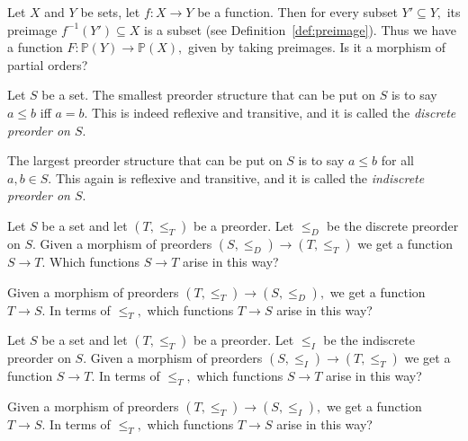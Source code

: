\documentclass[../main/CT4S-EN-RU]{subfiles}
\begin{document}
\begin{applicationRUS}
\end{applicationRUS}

\begin{exerciseENG}
Let $X$ and $Y$ be sets, let $f\colon X{→} Y$ be a function. Then for every subset $Y'\subseteq Y,$ its preimage $f^{-1}(Y')\subseteq X$ is a subset (see Definition~\ref{def:preimage}). Thus we have a function $F\colon{ℙ}(Y){→}{ℙ}(X),$ given by taking preimages. Is it a morphism of partial orders?
\end{exerciseENG}

\begin{exerciseRUS}
\end{exerciseRUS}

\begin{exampleENG}\label{ex:discrete and indiscrete}
Let $S$ be a set. The smallest preorder structure that can be put on $S$ is to say $a\leq b$ iff $a=b.$ This is indeed reflexive and transitive, and it is called the {\em discrete preorder on $S$}.

The largest preorder structure that can be put on $S$ is to say $a\leq b$ for all $a,b\in S.$ This again is reflexive and transitive, and it is called the {\em indiscrete preorder on $S$}.
\end{exampleENG}

\begin{exampleRUS}\label{ex:discrete and indiscrete}
\end{exampleRUS}

\begin{exerciseENG}
Let $S$ be a set and let $(T,\leq_T)$ be a preorder. Let $\leq_D$ be the discrete preorder on $S.$ Given a morphism of preorders $(S,\leq_D){→} (T,\leq_T)$ we get a function $S{→} T.$ 
\sexc Which functions $S{→} T$ arise in this way? 
\item Given a morphism of preorders $(T,\leq_T){→}(S,\leq_D),$ we get a function $T{→} S.$ In terms of $\leq_T,$ which functions $T{→} S$ arise in this way?
\endsexc
\end{exerciseENG}

\begin{exerciseRUS}
\end{exerciseRUS}

\begin{exerciseENG}
Let $S$ be a set and let $(T,\leq_T)$ be a preorder. Let $\leq_I$ be the indiscrete preorder on $S.$ Given a morphism of preorders $(S,\leq_I){→} (T,\leq_T)$ we get a function $S{→} T.$ 
\sexc In terms of $\leq_T,$ which functions $S{→} T$ arise in this way? 
\item Given a morphism of preorders $(T,\leq_T){→}(S,\leq_I),$ we get a function $T{→} S.$ In terms of $\leq_T,$ which functions $T{→} S$ arise in this way?
\endsexc
\end{exerciseENG}
\end{document}
